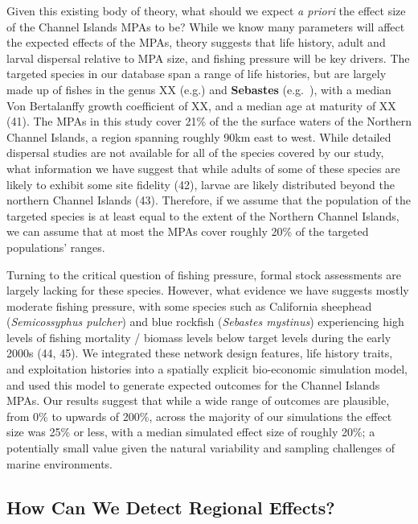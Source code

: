 \documentclass[9pt,twocolumn,twoside,lineno]{pnas-new}
\begin{document}
Given this existing body of theory, what should we expect \emph{a
priori} the effect size of the Channel Islands MPAs to be? While we know
many parameters will affect the expected effects of the MPAs, theory
suggests that life history, adult and larval dispersal relative to MPA
size, and fishing pressure will be key drivers. The targeted species in
our database span a range of life histories, but are largely made up of
fishes in the genus XX (e.g.) and \textbf{Sebastes} (e.g.~), with a
median Von Bertalanffy growth coefficient of XX, and a median age at
maturity of XX (41). The MPAs in this study cover 21\% of the the
surface waters of the Northern Channel Islands, a region spanning
roughly 90km east to west. While detailed dispersal studies are not
available for all of the species covered by our study, what information
we have suggest that while adults of some of these species are likely to
exhibit some site fidelity (42), larvae are likely distributed beyond
the northern Channel Islands (43). Therefore, if we assume that the
population of the targeted species is at least equal to the extent of
the Northern Channel Islands, we can assume that at most the MPAs cover
roughly 20\% of the targeted populations' ranges.

Turning to the critical question of fishing pressure, formal stock
assessments are largely lacking for these species. However, what
evidence we have suggests mostly moderate fishing pressure, with some
species such as California sheephead (\emph{Semicossyphus pulcher}) and
blue rockfish (\emph{Sebastes mystinus}) experiencing high levels of
fishing mortality / biomass levels below target levels during the early
2000s (44, 45). We integrated these network design features, life
history traits, and exploitation histories into a spatially explicit
bio-economic simulation model, and used this model to generate expected
outcomes for the Channel Islands MPAs. Our results suggest that while a
wide range of outcomes are plausible, from 0\% to upwards of 200\%,
across the majority of our simulations the effect size was 25\% or less,
with a median simulated effect size of roughly 20\%; a potentially small
value given the natural variability and sampling challenges of marine
environments.

\hypertarget{how-can-we-detect-regional-effects}{%
\subsection{How Can We Detect Regional
Effects?}\label{how-can-we-detect-regional-effects}}
\end{document}
